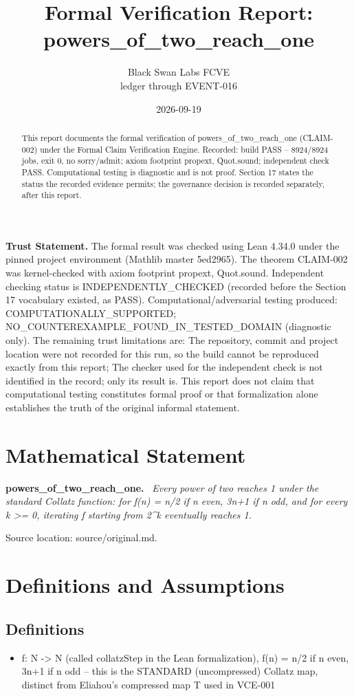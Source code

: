 \documentclass[11pt]{article}
\title{Formal Verification Report: powers\_of\_two\_reach\_one}
\author{Black Swan Labs FCVE \\ ledger through EVENT-016}
\date{2026-09-19}
\newenvironment{sourceresult}[1]{\par\medskip\noindent\textbf{#1.}\ \itshape}{\par\medskip}
\begin{document}
\maketitle

\noindent\textbf{Trust Statement.} The formal result was checked using Lean 4.34.0 under the pinned project environment (Mathlib master 5ed2965). The theorem CLAIM-002 was kernel-checked with axiom footprint propext, Quot.sound. Independent checking status is INDEPENDENTLY\_CHECKED (recorded before the Section 17 vocabulary existed, as PASS). Computational/adversarial testing produced: COMPUTATIONALLY\_SUPPORTED; NO\_COUNTEREXAMPLE\_FOUND\_IN\_TESTED\_DOMAIN (diagnostic only). The remaining trust limitations are: The repository, commit and project location were not recorded for this run, so the build cannot be reproduced exactly from this report; The checker used for the independent check is not identified in the record; only its result is. This report does not claim that computational testing constitutes formal proof or that formalization alone establishes the truth of the original informal statement.

\begin{abstract}
This report documents the formal verification of powers\_of\_two\_reach\_one (CLAIM-002) under the Formal Claim Verification Engine. Recorded: build PASS -- 8924/8924 jobs, exit 0, no sorry/admit; axiom footprint propext, Quot.sound; independent check PASS. Computational testing is diagnostic and is not proof. Section 17 states the status the recorded evidence permits; the governance decision is recorded separately, after this report.
\end{abstract}

\section{Mathematical Statement}
\begin{sourceresult}{powers\_of\_two\_reach\_one}
Every power of two reaches 1 under the standard Collatz function: for f(n) = n/2 if n even, 3n+1 if n odd, and for every k >= 0, iterating f starting from 2\textasciicircum{}k eventually reaches 1.
\end{sourceresult}
Source location: source/original.md.

\section{Definitions and Assumptions}
\subsection*{Definitions}
\begin{itemize}
\item f: N -> N (called collatzStep in the Lean formalization), f(n) = n/2 if n even, 3n+1 if n odd -- this is the STANDARD (uncompressed) Collatz map, distinct from Eliahou's compressed map T used in VCE-001
\end{itemize}
\end{document}
